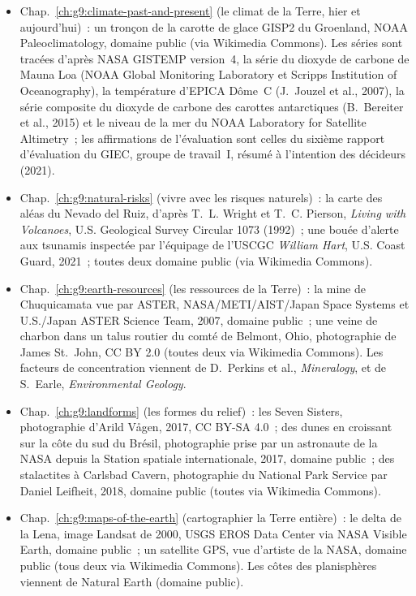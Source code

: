 \begin{itemize}
  \item Chap.~\ref{ch:g9:climate-past-and-present} (le climat de la Terre, hier et aujourd'hui)~: un tronçon de la carotte de glace GISP2 du Groenland, NOAA Paleoclimatology, domaine public (via Wikimedia Commons). Les séries sont tracées d'après NASA GISTEMP version~4, la série du dioxyde de carbone de Mauna Loa (NOAA Global Monitoring Laboratory et Scripps Institution of Oceanography), la température d'EPICA Dôme~C (J.~Jouzel et al., 2007), la série composite du dioxyde de carbone des carottes antarctiques (B.~Bereiter et al., 2015) et le niveau de la mer du NOAA Laboratory for Satellite Altimetry~; les affirmations de l'évaluation sont celles du sixième rapport d'évaluation du GIEC, groupe de travail~I, résumé à l'intention des décideurs (2021).
  \item Chap.~\ref{ch:g9:natural-risks} (vivre avec les risques naturels)~: la carte des aléas du Nevado del Ruiz, d'après T.~L. Wright et T.~C. Pierson, \emph{Living with Volcanoes}, U.S. Geological Survey Circular 1073 (1992)~; une bouée d'alerte aux tsunamis inspectée par l'équipage de l'USCGC \emph{William Hart}, U.S. Coast Guard, 2021~; toutes deux domaine public (via Wikimedia Commons).
  \item Chap.~\ref{ch:g9:earth-resources} (les ressources de la Terre)~: la mine de Chuquicamata vue par ASTER, NASA/\allowbreak METI/\allowbreak AIST/\allowbreak Japan Space Systems et U.S./Japan ASTER Science Team, 2007, domaine public~; une veine de charbon dans un talus routier du comté de Belmont, Ohio, photographie de James St.~John, CC BY 2.0 (toutes deux via Wikimedia Commons). Les facteurs de concentration viennent de D.~Perkins et al., \emph{Mineralogy}, et de S.~Earle, \emph{Environmental Geology}.
  \item Chap.~\ref{ch:g9:landforms} (les formes du relief)~: les Seven Sisters, photographie d'Arild Vågen, 2017, CC BY-SA 4.0~; des dunes en croissant sur la côte du sud du Brésil, photographie prise par un astronaute de la NASA depuis la Station spatiale internationale, 2017, domaine public~; des stalactites à Carlsbad Cavern, photographie du National Park Service par Daniel Leifheit, 2018, domaine public (toutes via Wikimedia Commons).
  \item Chap.~\ref{ch:g9:maps-of-the-earth} (cartographier la Terre entière)~: le delta de la Lena, image Landsat de 2000, USGS EROS Data Center via NASA Visible Earth, domaine public~; un satellite GPS, vue d'artiste de la NASA, domaine public (tous deux via Wikimedia Commons). Les côtes des planisphères viennent de Natural Earth (domaine public).
\end{itemize}
